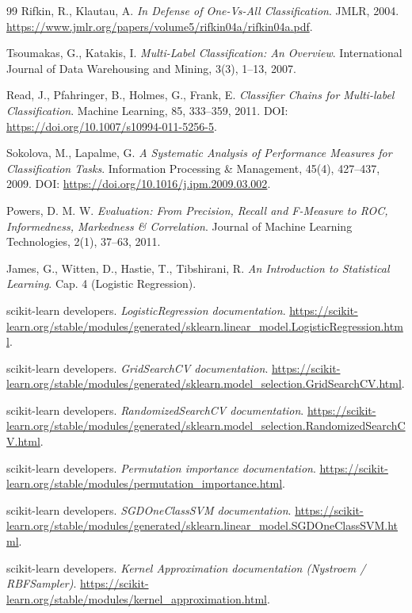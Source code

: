 \documentclass[12pt,oneside]{report}
\begin{document}
\begin{thebibliography}{99}
Rifkin, R., Klautau, A. \emph{In Defense of One-Vs-All Classification}. JMLR, 2004.
\url{https://www.jmlr.org/papers/volume5/rifkin04a/rifkin04a.pdf}.

Tsoumakas, G., Katakis, I. \emph{Multi-Label Classification: An Overview}. International Journal of Data Warehousing and Mining, 3(3), 1--13, 2007.

Read, J., Pfahringer, B., Holmes, G., Frank, E.
\emph{Classifier Chains for Multi-label Classification}.
Machine Learning, 85, 333--359, 2011. DOI: \url{https://doi.org/10.1007/s10994-011-5256-5}.

Sokolova, M., Lapalme, G.
\emph{A Systematic Analysis of Performance Measures for Classification Tasks}.
Information Processing \& Management, 45(4), 427--437, 2009. DOI: \url{https://doi.org/10.1016/j.ipm.2009.03.002}.

Powers, D. M. W.
\emph{Evaluation: From Precision, Recall and F-Measure to ROC, Informedness, Markedness \& Correlation}.
Journal of Machine Learning Technologies, 2(1), 37--63, 2011.

James, G., Witten, D., Hastie, T., Tibshirani, R. \emph{An Introduction to Statistical Learning}. Cap. 4 (Logistic Regression).

scikit-learn developers. \emph{LogisticRegression documentation}. \url{https://scikit-learn.org/stable/modules/generated/sklearn.linear_model.LogisticRegression.html}.

scikit-learn developers. \emph{GridSearchCV documentation}. \url{https://scikit-learn.org/stable/modules/generated/sklearn.model_selection.GridSearchCV.html}.

scikit-learn developers. \emph{RandomizedSearchCV documentation}. \url{https://scikit-learn.org/stable/modules/generated/sklearn.model_selection.RandomizedSearchCV.html}.

scikit-learn developers. \emph{Permutation importance documentation}. \url{https://scikit-learn.org/stable/modules/permutation_importance.html}.

scikit-learn developers. \emph{SGDOneClassSVM documentation}. \url{https://scikit-learn.org/stable/modules/generated/sklearn.linear_model.SGDOneClassSVM.html}.

scikit-learn developers. \emph{Kernel Approximation documentation (Nystroem / RBFSampler)}. \url{https://scikit-learn.org/stable/modules/kernel_approximation.html}.


\end{thebibliography}
\end{document}

